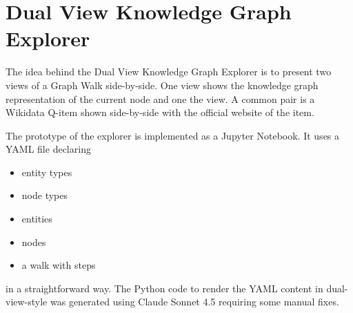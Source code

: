 \documentclass[runningheads]{llncs}
\begin{document}
\section{Dual View Knowledge Graph Explorer}
The idea behind the Dual View Knowledge Graph Explorer is to present two views of a Graph Walk side-by-side. One view shows the knowledge graph representation of the current node and one the  view. A common pair is a Wikidata Q-item shown side-by-side with the official website of the item.

The prototype of the explorer is implemented as a Jupyter Notebook.
It uses a YAML file declaring
\begin{itemize}
    \item entity types
    \item node types
    \item entities
    \item nodes
    \item a walk with steps
\end{itemize}

in a straightforward way. The Python code to render the YAML content in dual- view-style was generated using Claude Sonnet 4.5 requiring some manual fixes.
\end{document}
